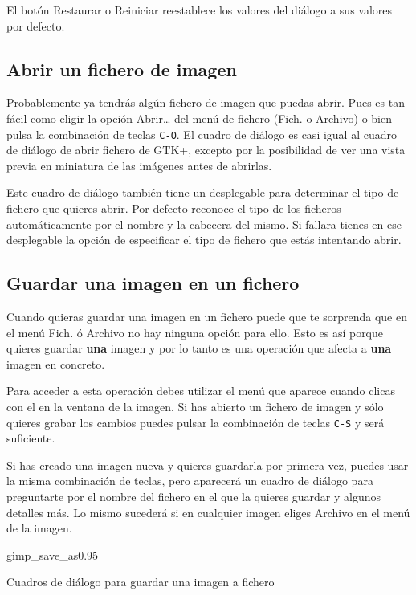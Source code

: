 El botón {\sf Restaurar} o {\sf Reiniciar} reestablece los valores del
diálogo a sus valores por defecto.

\subsection{Abrir un fichero de imagen}

Probablemente ya  tendrás algún  fichero de  imagen que  puedas abrir.
Pues es tan  fácil como eligir la opción {\sf  Abrir\dots} del menú de
fichero ({\sf Fich.}  o {\sf Archivo}) o bien pulsa  la combinación de
teclas {\tt  C-O}. El  cuadro de  diálogo es casi  igual al  cuadro de
diálogo de  abrir fichero de GTK+,  excepto por la posibilidad  de ver
una vista previa en miniatura de las imágenes antes de abrirlas.

Este cuadro de diálogo también tiene un desplegable para determinar el
tipo de fichero que quieres abrir.  Por defecto \gimp reconoce el tipo
de los ficheros automáticamente por el nombre y la cabecera del mismo.
Si fallara tienes en ese desplegable  la opción de especificar el tipo
de fichero que estás intentando abrir.

\subsection{Guardar una imagen en un fichero}

Cuando quieras guardar una imagen en un fichero puede que te sorprenda
que en el menú {\sf Fich.} ó  {\sf Archivo} no hay ninguna opción para
ello. Esto  es así porque  quieres guardar {\bf  una} imagen y  por lo
tanto es una operación que afecta a {\bf una} imagen en concreto.

Para  acceder a  esta operación  debes  utilizar el  menú que  aparece
cuando clicas con el  \bdr en la ventana de la  imagen. Si has abierto
un fichero de  imagen y sólo quieres grabar los  cambios puedes pulsar
la combinación de teclas {\tt C-S} y será suficiente.

Si has  creado una imagen nueva  y quieres guardarla por  primera vez,
puedes usar la  misma combinación de teclas, pero  aparecerá un cuadro
de  diálogo para  preguntarte  por el  nombre del  fichero  en el  que
la  quieres guardar  y  algunos  detalles más.  Lo  mismo sucederá  si
en  cualquier  imagen  eliges {\sf  Archivo} en el menú de la imagen.

\begin{figura}{gimp_save_as}{0.95}
\caption{Cuadros de diálogo para guardar una imagen a fichero}
\end{figura}

